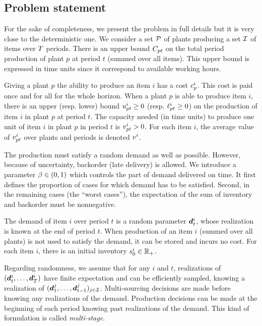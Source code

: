 

\subsection{Problem statement}
\label{sec:multi-sourcing:stochastic:introduction:problem-statement}


For the sake of completeness, we present the problem in full details but it is very close to the deterministic one.
We consider a set $\mathcal{P}$ of plants producing a set $\mathcal{I}$ of items over $T$ periods.
There is an upper bound $C_{pt}$ on the total period production of plant $p$ at period $t$ (summed over all items).
This upper bound is expressed in time units since it correspond to available working hours.


Giving a plant $p$ the ability to produce an item $i$ has a cost $c_p^i$.
This cost is paid once and for all for the whole horizon.
When a plant $p$ is able to produce item $i$, there is an upper (resp. lower) bound $u_{pt}^i\ge 0$ (resp. $\ell_{pt}^i\ge 0$) on the production of item $i$ in plant $p$ at period $t$.
The capacity needed (in time units) to produce one unit of item $i$ in plant $p$ in period $t$ is $v_{pt}^i>0$.
For each item $i$, the average value of $v_{pt}^i$ over plants and periods is denoted $v^i$.


The production must satisfy a random demand as well as possible.
However, because of uncertainty, backorder (\ie late delivery) is allowed.
We introduce a parameter $\servicelvl\in\bracket{0,1}$ which controls the part of demand delivered on time.
It first defines the proportion of cases for which demand has to be satisfied.
Second, in the remaining cases (\ie the ``worst cases''), the expectation of the sum of inventory and backorder must be nonnegative.


The demand of item $i$ over period $t$ is a random parameter $\va\demand_t^i$, whose realization is known at the end of period $t$.
When production of an item $i$ (summed over all plants) is not used to satisfy the demand, it can be stored and incurs no cost.
For each item $i$, there is an initial inventory $s_0^i\in\mathbb{R}_+$.


Regarding randomness, we assume that for any $i$ and $t$, realizations of $(\va\demand_t^i,\ldots,\va\demand_{\horizon}^i)$ have finite expectation and can be efficiently sampled, knowing a realization of $(\va\demand_1^j,\ldots,\va\demand_{t-1}^j)_{j\in\REF}$.
Multi-sourcing decisions are made before knowing any realizations of the demand.
Production decisions can be made at the beginning of each period knowing past realizations of the demand.
This kind of formulation is called \emph{multi-stage}.


